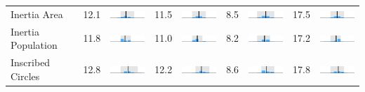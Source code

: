 \begin{table}
\begin{tabular}{l rm{7em} rm{7em} rm{7em} rm{7em}}
Inertia Area           &  12.1 &    \includegraphics[width=7em]{mini_hist/TX_senate_2008_inertia_a} &  11.5 &    \includegraphics[width=7em]{mini_hist/TX_senate_2012_inertia_a} &   8.5 &    \includegraphics[width=7em]{mini_hist/TX_senate_2014_inertia_a} &  17.5 &    \includegraphics[width=7em]{mini_hist/TX_senate_2018_inertia_a} \\
Inertia Population     &  11.8 &    \includegraphics[width=7em]{mini_hist/TX_senate_2008_inertia_p} &  11.0 &    \includegraphics[width=7em]{mini_hist/TX_senate_2012_inertia_p} &   8.2 &    \includegraphics[width=7em]{mini_hist/TX_senate_2014_inertia_p} &  17.2 &    \includegraphics[width=7em]{mini_hist/TX_senate_2018_inertia_p} \\
Inscribed Circles      &  12.8 &    \includegraphics[width=7em]{mini_hist/TX_senate_2008_ehrenburg} &  12.2 &    \includegraphics[width=7em]{mini_hist/TX_senate_2012_ehrenburg} &   8.6 &    \includegraphics[width=7em]{mini_hist/TX_senate_2014_ehrenburg} &  17.8 &    \includegraphics[width=7em]{mini_hist/TX_senate_2018_ehrenburg} \\

\end{tabular}
\end{table}
